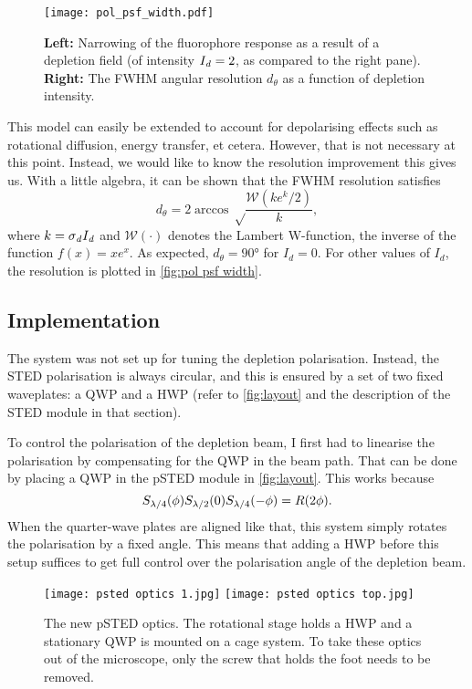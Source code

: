 \begin{figure}
	\centering
	\texttt{[image: pol\_psf\_width.pdf]}
	\caption{
		\textbf{Left:} Narrowing of the fluorophore response as a result of a depletion field (of intensity $ I_{\mathit{d}}=2 $, as compared to the right pane). \textbf{Right:} The FWHM angular resolution $ d_\theta $ as a function of depletion intensity.
	}
	\label{fig:pol psf width}
\end{figure}

This model can easily be extended to account for depolarising effects such as rotational diffusion, energy transfer, et cetera. However, that is not necessary at this point. Instead, we would like to know the resolution improvement this gives us. With a little algebra, it can be shown that the FWHM resolution satisfies
\begin{equation}
	d_\theta = 2\arccos\sqrt\frac{\mathcal{W}(k e^{k}/2)}{k},
\end{equation}
where $ k = \sigma_{\mathit{d}} I_{\mathit{d}} $ and $ \mathcal{W}(\cdot) $ denotes the Lambert W-function, the inverse of the function $ f(x) = xe^x $. As expected, $ d_\theta=\ang{90} $ for $ I_d=0 $. For other values of $ I_d $, the resolution is plotted in \autoref{fig:pol psf width}.


\subsection{Implementation}
\label{sec:psted implementation}

The system was not set up for tuning the depletion polarisation. Instead, the STED polarisation is always circular, and this is ensured by a set of two fixed waveplates: a QWP and a HWP (refer to \autoref{fig:layout} and the description of the STED module in that section). 

To control the polarisation of the depletion beam, I first had to linearise the polarisation by compensating for the QWP in the beam path. That can be done by placing a QWP in the pSTED module in \autoref{fig:layout}. This works because 
\begin{equation}
	S_{\lambda/4}(\phi)S_{\lambda/2}(0)S_{\lambda/4}(-\phi) = R(2\phi).
\end{equation}
When the quarter-wave plates are aligned like that, this system simply rotates the polarisation by a fixed angle. This means that adding a HWP before this setup suffices to get full control over the polarisation angle of the depletion beam.

\begin{figure}
	\centering
	\texttt{[image: psted optics 1.jpg]}%
	\hfill%
	\texttt{[image: psted optics top.jpg]}
	\caption{
		The new pSTED optics. The rotational stage holds a HWP and a stationary QWP is mounted on a cage system. To take these optics out of the microscope, only the screw that holds the foot needs to be removed.
	}
	\label{fig:psted optics photo}
\end{figure}

